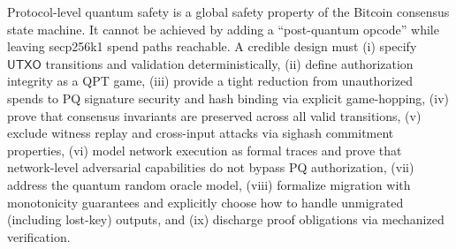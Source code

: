 \documentclass[11pt]{article}
\newcommand{\UTXO}{\mathsf{UTXO}}
\begin{document}
Protocol-level quantum safety is a global safety property of the Bitcoin consensus state machine.
It cannot be achieved by adding a ``post-quantum opcode'' while leaving secp256k1 spend paths reachable.
A credible design must (i) specify $\UTXO$ transitions and validation deterministically, (ii) define authorization integrity as a QPT game, (iii) provide a tight reduction from unauthorized spends to PQ signature security and hash binding via explicit game-hopping, (iv) prove that consensus invariants are preserved across all valid transitions, (v) exclude witness replay and cross-input attacks via sighash commitment properties, (vi) model network execution as formal traces and prove that network-level adversarial capabilities do not bypass PQ authorization, (vii) address the quantum random oracle model, (viii) formalize migration with monotonicity guarantees and explicitly choose how to handle unmigrated (including lost-key) outputs, and (ix) discharge proof obligations via mechanized verification.
\end{document}
